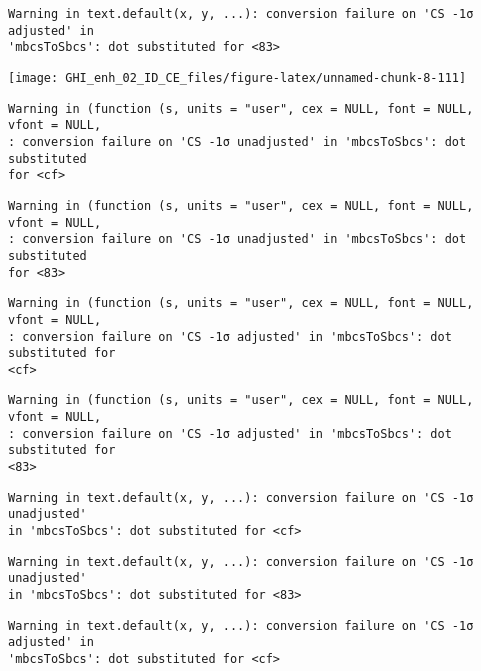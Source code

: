 \documentclass[
  10pt,
  a4paper,oneside]{article}
\begin{document}
\begin{verbatim}
Warning in text.default(x, y, ...): conversion failure on 'CS -1σ adjusted' in
'mbcsToSbcs': dot substituted for <83>
\end{verbatim}

\begin{center}\texttt{[image: GHI\_enh\_02\_ID\_CE\_files/figure-latex/unnamed-chunk-8-111]} \end{center}

\begin{verbatim}
Warning in (function (s, units = "user", cex = NULL, font = NULL, vfont = NULL,
: conversion failure on 'CS -1σ unadjusted' in 'mbcsToSbcs': dot substituted
for <cf>
\end{verbatim}

\begin{verbatim}
Warning in (function (s, units = "user", cex = NULL, font = NULL, vfont = NULL,
: conversion failure on 'CS -1σ unadjusted' in 'mbcsToSbcs': dot substituted
for <83>
\end{verbatim}

\begin{verbatim}
Warning in (function (s, units = "user", cex = NULL, font = NULL, vfont = NULL,
: conversion failure on 'CS -1σ adjusted' in 'mbcsToSbcs': dot substituted for
<cf>
\end{verbatim}

\begin{verbatim}
Warning in (function (s, units = "user", cex = NULL, font = NULL, vfont = NULL,
: conversion failure on 'CS -1σ adjusted' in 'mbcsToSbcs': dot substituted for
<83>
\end{verbatim}

\begin{verbatim}
Warning in text.default(x, y, ...): conversion failure on 'CS -1σ unadjusted'
in 'mbcsToSbcs': dot substituted for <cf>
\end{verbatim}

\begin{verbatim}
Warning in text.default(x, y, ...): conversion failure on 'CS -1σ unadjusted'
in 'mbcsToSbcs': dot substituted for <83>
\end{verbatim}

\begin{verbatim}
Warning in text.default(x, y, ...): conversion failure on 'CS -1σ adjusted' in
'mbcsToSbcs': dot substituted for <cf>
\end{verbatim}
\end{document}
